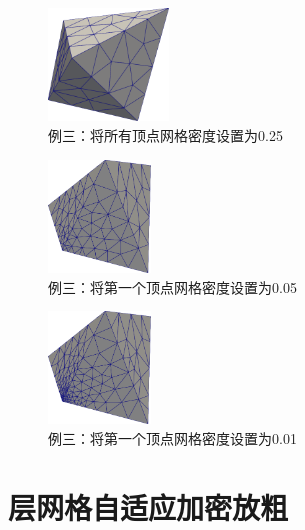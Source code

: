 \begin{figure}[!htbp]
  \centering
  \includegraphics[height=3cm]{fig/2/13.png}
  \caption{例三：将所有顶点网格密度设置为0.25}
  \label{fig:2-1}
\end{figure}

\begin{figure}[!htbp]
  \centering
  \includegraphics[height=3cm]{fig/2/14.png}
  \caption{例三：将第一个顶点网格密度设置为0.05}
  \label{fig:2-1}
\end{figure}

\begin{figure}[!htbp]
  \centering
  \includegraphics[height=3cm]{fig/2/15.png}
  \caption{例三：将第一个顶点网格密度设置为0.01}
  \label{fig:2-1}
\end{figure}

\section{层网格自适应加密放粗}
